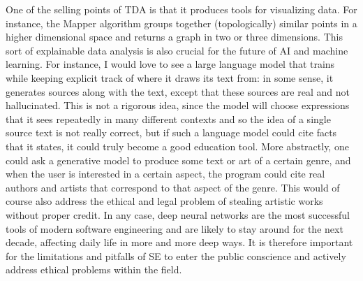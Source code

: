 \documentclass[11pt, oneside]{article}
\begin{document}
One of the selling points of TDA is that it produces tools for visualizing data. For instance, the Mapper algorithm groups together (topologically) similar points in a higher dimensional space and returns a graph in two or three dimensions. This sort of explainable data analysis is also crucial for the future of AI and machine learning. For instance, I would love to see a large language model that trains while keeping explicit track of where it draws its text from: in some sense, it generates sources along with the text, except that these sources are real and not hallucinated. This is not a rigorous idea, since the model will choose expressions that it sees repeatedly in many different contexts and so the idea of a single source text is not really correct, but if such a language model could cite facts that it states, it could truly become a good education tool. More abstractly, one could ask a generative model to produce some text or art of a certain genre, and when the user is interested in a certain aspect, the program could cite real authors and artists that correspond to that aspect of the genre. This would of course also address the ethical and legal problem of stealing artistic works without proper credit.
In any case, deep neural networks are the most successful tools of modern software engineering and are likely to stay around for the next decade, affecting daily life in more and more deep ways. It is therefore important for the limitations and pitfalls of SE to enter the public conscience and actively address ethical problems within the field.
\end{document}

